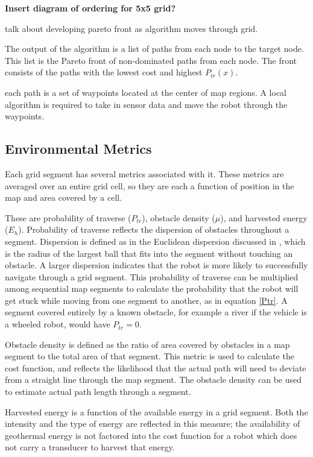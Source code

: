 \documentclass[journal]{IEEEtran}
\begin{document}
\textbf{Insert diagram of ordering for 5x5 grid?}

talk about developing pareto front as algorithm moves through grid.

The output of the algorithm is a list of paths from each node to the target node. This list is the Pareto front of non-dominated paths from each node. 
The front consists of the paths with the lowest cost and highest $P_{tr}(x)$. 

each path is a set of waypoints located at the center of map regions. A local algorithm is required to take in sensor data and move the robot through the waypoints. 

\subsection{Environmental Metrics}
Each grid segment has several metrics associated with it. These metrics are averaged over an entire grid cell, so they are each a function of position in the map and area covered by a cell.

These are probability of traverse ($P_{tr}$), obstacle density ($\mu$), and harvested energy ($E_h$). Probability of traverse reflects the dispersion of obstacles throughout a segment. 
Dispersion is defined as in the Euclidean dispersion discussed in \cite{LaValle Branicky Lindeman}, which is the radius of the largest ball that fits into the segment without touching an obstacle. 
A larger dispersion indicates that the robot is more likely to successfully navigate through a grid segment.
This probability of traverse can be multiplied among sequential map segments to calculate the probability that the robot will get stuck while moving from one segment to another, as in equation \ref{Ptr}. 
A segment covered entirely by a known obstacle, for example a river if the vehicle is a wheeled robot, would have $P_{tr} = 0$. 

Obstacle density is defined as the ratio of area covered by obstacles in a map segment to the total area of that segment. 
This metric is used to calculate the cost function, and reflects the likelihood that the actual path will need to deviate from a straight line through the map segment. 
The obstacle density can be used to estimate actual path length through a segment.

Harvested energy is a function of the available energy in a grid segment. Both the intensity and the type of energy are reflected in this measure; the availability of geothermal energy is not factored into the cost function for a robot which does not carry a transducer to harvest that energy.
 
\end{document}
